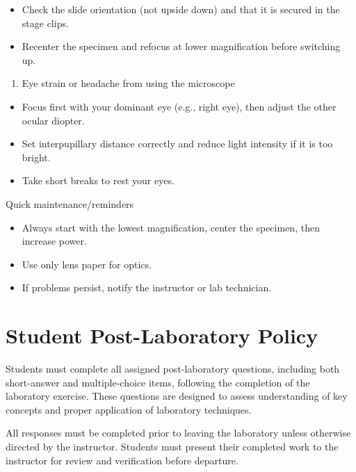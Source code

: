 \documentclass[
  letterpaper,
  DIV=11,
  numbers=noendperiod]{scrreprt}
\providecommand{\tightlist}{%
  \setlength{\itemsep}{0pt}\setlength{\parskip}{0pt}}
\begin{document}
\begin{itemize}
\item
  Check the slide orientation (not upside down) and that it is secured
  in the stage clips.
\item
  Recenter the specimen and refocus at lower magnification before
  switching up.
\end{itemize}

\begin{enumerate}
\def\labelenumi{\arabic{enumi}.}
\setcounter{enumi}{7}
\tightlist
\item
  Eye strain or headache from using the microscope
\end{enumerate}

\begin{itemize}
\item
  Focus first with your dominant eye (e.g., right eye), then adjust the
  other ocular diopter.
\item
  Set interpupillary distance correctly and reduce light intensity if it
  is too bright.
\item
  Take short breaks to rest your eyes.
\end{itemize}

Quick maintenance/reminders

\begin{itemize}
\item
  Always start with the lowest magnification, center the specimen, then
  increase power.
\item
  Use only lens paper for optics.
\item
  If problems persist, notify the instructor or lab technician.
\end{itemize}

\section{\texorpdfstring{\textbf{Student Post-Laboratory
Policy}}{Student Post-Laboratory Policy}}\label{student-post-laboratory-policy}

Students must complete all assigned post-laboratory questions, including
both short-answer and multiple-choice items, following the completion of
the laboratory exercise. These questions are designed to assess
understanding of key concepts and proper application of laboratory
techniques.

All responses must be completed prior to leaving the laboratory unless
otherwise directed by the instructor. Students must present their
completed work to the instructor for review and verification before
departure.
\end{document}
